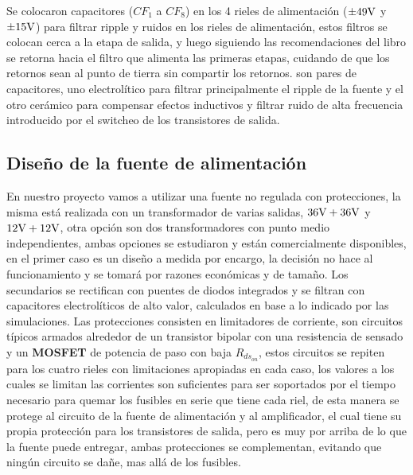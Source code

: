 


Se colocaron capacitores ($CF_{1}$ a $CF_{8}$) en los 4 rieles de alimentación ($\pm 49 \si[per-mode=symbol]{\volt}$ y $\pm 15 \si[per-mode=symbol]{\volt}$) para filtrar ripple y ruidos en los rieles de alimentación, estos filtros se colocan cerca a la etapa de salida, y luego siguiendo las recomendaciones del libro se retorna hacia el filtro que alimenta las primeras etapas, cuidando de que los retornos sean al punto de tierra sin compartir los retornos. son pares de capacitores, uno electrolítico para filtrar principalmente el ripple de la fuente y el otro cerámico para compensar efectos inductivos y filtrar ruido de alta frecuencia introducido por el switcheo de los transistores de salida.


\subsection{Diseño de la fuente de alimentación}


\label{sec:fuente}

En nuestro proyecto vamos a utilizar una fuente no regulada con protecciones, la misma está realizada con un transformador de varias salidas, $36 \si[per-mode=symbol]{\volt} + 36 \si[per-mode=symbol]{\volt}$ y $12 \si[per-mode=symbol]{\volt} + 12 \si[per-mode=symbol]{\volt}$, otra opción son dos transformadores con punto medio independientes, ambas opciones se estudiaron y están comercialmente disponibles, en el primer caso es un diseño a medida por encargo, la decisión no hace al funcionamiento y se tomará por razones económicas y de tamaño. Los secundarios se rectifican con puentes de diodos integrados y se filtran con capacitores electrolíticos de alto valor, calculados en base a lo indicado por las simulaciones. Las protecciones consisten en limitadores de corriente, son circuitos típicos armados alrededor de un transistor bipolar con una resistencia de sensado y un \textbf{MOSFET} de potencia de paso con baja $R_{ds_{on}}$, estos circuitos se repiten para los cuatro rieles con limitaciones apropiadas en cada caso, los valores a los cuales se limitan las corrientes son suficientes para ser soportados por el tiempo necesario para quemar los fusibles en serie que tiene cada riel, de esta manera se protege al circuito de la fuente de alimentación y al amplificador, el cual tiene su propia protección para los transistores de salida, pero es muy por arriba de lo que la fuente puede entregar, ambas protecciones se complementan, evitando que ningún circuito se dañe, mas allá de los fusibles.

